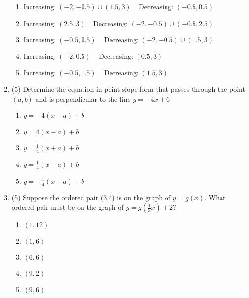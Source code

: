 \documentclass[fleqn]{article}
\begin{document}
\begin{enumerate}
\begin{enumerate}
\item Increasing: $(-2,-0.5)\cup(1.5,3)$ ~ Decreasing: $(-0.5,0.5)$
\item Increasing: $(2.5,3)$ ~ Decreasing: $(-2,-0.5)\cup(-0.5,2.5)$
\item Increasing: $(-0.5,0.5)$ ~ Decreasing: $(-2,-0.5)\cup(1.5,3)$
\item Increasing: $(-2,0.5)$ ~ Decreasing: $(0.5,3)$
\item Increasing: $(-0.5,1.5)$ ~ Decreasing: $(1.5,3)$
\end{enumerate}

\item (5) Determine the equation in point slope form that passes through the point $(a,b)$ and is perpendicular to the line $y=-4x+6$

\begin{multicols}{3}
\begin{enumerate}
\item $y=-4(x-a)+b$
\item $y=4(x-a)+b$
\item $y = \frac{1}{4}(x+a) +b$
\item $y=\frac{1}{4}(x-a) +b$
\item $y=-\frac{1}{4}(x-a)+b$
\end{enumerate}
\end{multicols}

\item (5) Suppose the ordered pair (3,4) is on the graph of $y=g(x)$. What ordered pair must be on the graph of $y=g(\frac{1}{3}x)+2$?

\begin{multicols}{3}
\begin{enumerate}
\item $(1,12)$
\item $(1,6)$
\item $(6,6)$
\item $(9,2)$
\item $(9,6)$
\end{enumerate}
\end{multicols}






\end{enumerate}
\end{document}
